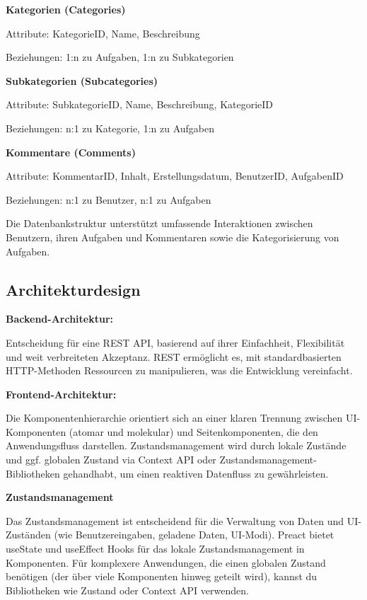 \documentclass[12pt,a4paper]{article} %
\begin{document}
    \textbf{Kategorien (Categories)}

        Attribute: KategorieID, Name, Beschreibung

        Beziehungen: 1:n zu Aufgaben, 1:n zu Subkategorien

    \textbf{Subkategorien (Subcategories)}

        Attribute: SubkategorieID, Name, Beschreibung, KategorieID

        Beziehungen: n:1 zu Kategorie, 1:n zu Aufgaben

    \textbf{Kommentare (Comments)}

        Attribute: KommentarID, Inhalt, Erstellungsdatum, BenutzerID, AufgabenID

        Beziehungen: n:1 zu Benutzer, n:1 zu Aufgaben

Die Datenbankstruktur unterstützt umfassende Interaktionen zwischen Benutzern, ihren Aufgaben und Kommentaren sowie die Kategorisierung von Aufgaben.


\subsection{Architekturdesign}

\textbf{Backend-Architektur:}

Entscheidung für eine REST API, basierend auf ihrer Einfachheit, Flexibilität und weit verbreiteten Akzeptanz. REST ermöglicht es, mit standardbasierten HTTP-Methoden Ressourcen zu manipulieren, was die Entwicklung vereinfacht.

\textbf{Frontend-Architektur:}

Die Komponentenhierarchie orientiert sich an einer klaren Trennung zwischen UI-Komponenten (atomar und molekular) und Seitenkomponenten, die den Anwendungsfluss darstellen. Zustandsmanagement wird durch lokale Zustände und ggf. globalen Zustand via Context API oder Zustandsmanagement-Bibliotheken gehandhabt, um einen reaktiven Datenfluss zu gewährleisten.


\textbf{Zustandsmanagement}

Das Zustandsmanagement ist entscheidend für die Verwaltung von Daten und UI-Zuständen (wie Benutzereingaben, geladene Daten, UI-Modi). Preact bietet useState und useEffect Hooks für das lokale Zustandsmanagement in Komponenten. Für komplexere Anwendungen, die einen globalen Zustand benötigen (der über viele Komponenten hinweg geteilt wird), kannst du Bibliotheken wie Zustand oder Context API verwenden.
\end{document}
